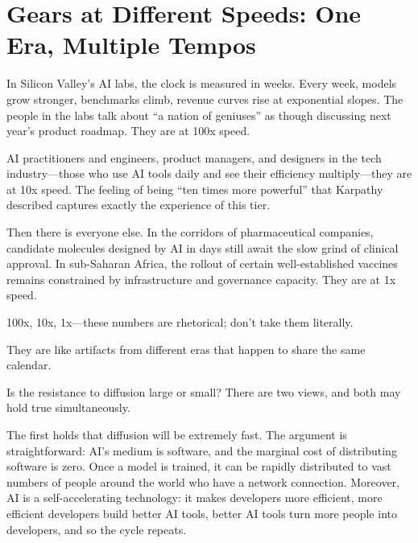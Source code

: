 \newpage
\section{Gears at Different Speeds: One Era, Multiple Tempos}

In Silicon Valley's AI labs, the clock is measured in weeks.
Every week, models grow stronger, benchmarks climb, revenue curves rise at exponential slopes.
The people in the labs talk about ``a nation of geniuses'' as though discussing next year's product roadmap.
They are at 100x speed.

\vspace{1em}

AI practitioners and engineers, product managers, and designers in the tech industry---those who use AI tools daily and see their efficiency multiply---they are at 10x speed. The feeling of being ``ten times more powerful'' that Karpathy described captures exactly the experience of this tier.

\vspace{1em}

Then there is everyone else. In the corridors of pharmaceutical companies, candidate molecules designed by AI in days still await the slow grind of clinical approval. In sub-Saharan Africa, the rollout of certain well-established vaccines remains constrained by infrastructure and governance capacity. They are at 1x speed.

\vspace{1em}

100x, 10x, 1x---these numbers are rhetorical; don't take them literally.

They are like artifacts from different eras that happen to share the same calendar.

Is the resistance to diffusion large or small? There are two views, and both may hold true simultaneously.

\vspace{1em}

The first holds that diffusion will be extremely fast. The argument is straightforward: AI's medium is software, and the marginal cost of distributing software is zero.
Once a model is trained, it can be rapidly distributed to vast numbers of people around the world who have a network connection.
Moreover, AI is a self-accelerating technology: it makes developers more efficient, more efficient developers build better AI tools, better AI tools turn more people into developers, and so the cycle repeats.

